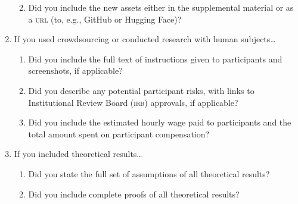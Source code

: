 \documentclass[11pt]{article}
\begin{document}
\begin{enumerate}
\begin{enumerate}
    \answerYes{}
    \item Did you include the new assets either in the supplemental material or as
    a \textsc{url} (to, e.g., GitHub or Hugging Face)?
    \answerYes{}
  \end{enumerate}
\item If you used crowdsourcing or conducted research with human subjects\dots
  \begin{enumerate}
  \item Did you include the full text of instructions given to participants and
    screenshots, if applicable?
    \answerNA{}
  \item Did you describe any potential participant risks, with links to
    Institutional Review Board (\textsc{irb}) approvals, if applicable?
    \answerNA{}
  \item Did you include the estimated hourly wage paid to participants and the
    total amount spent on participant compensation?
    \answerNA{}
  \end{enumerate}
\item If you included theoretical results\dots
  \begin{enumerate}
  \item Did you state the full set of assumptions of all theoretical results?
    \answerNA{}
  \item Did you include complete proofs of all theoretical results?
    \answerNA{}
  \end{enumerate}
\end{enumerate}
\end{document}

